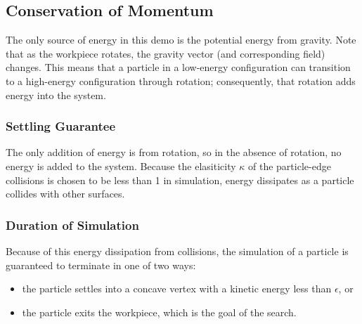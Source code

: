 

	\subsection{Conservation of Momentum}

		The only source of energy in this demo is the potential energy from gravity. Note that as the workpiece rotates, the gravity vector (and corresponding field) changes. This means that a particle in a low-energy configuration can transition to a high-energy configuration through rotation; consequently, that rotation adds energy into the system.

		\subsubsection{Settling Guarantee}

		The only addition of energy is from rotation, so in the absence of rotation, no energy is added to the system. Because the elasiticity $\kappa$ of the particle-edge collisions is chosen to be less than 1 in simulation, energy dissipates as a particle collides with other surfaces.

		\subsubsection{Duration of Simulation}

Because of this energy dissipation from collisions, the simulation of a particle is guaranteed to terminate in one of two ways:

\begin{itemize}
\item the particle settles into a concave vertex with a kinetic energy less than $\epsilon$, or
\item the particle exits the workpiece, which is the goal of the search.
\end{itemize}

